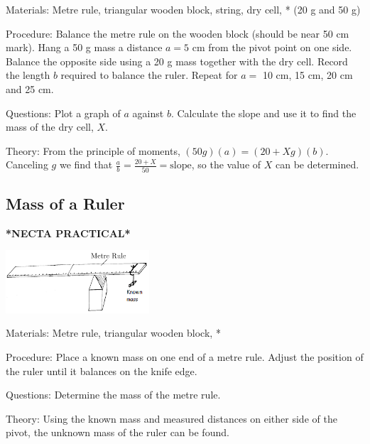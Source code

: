 \begin{multicols}{2}
\begin{description*}
\item[Materials:]{Metre rule, triangular wooden block, string, dry cell, * (20 g and 50 g)}
\item[Procedure:]{Balance the metre rule on the wooden block (should be near 50 cm mark). Hang a 50 g mass a distance $a=5$ cm from the pivot point on one side. Balance the opposite side using a 20 g mass together with the dry cell. Record the length $b$ required to balance the ruler. Repeat for $a =$ 10 cm, 15 cm, 20 cm and 25 cm.}
\item[Questions:]{Plot a graph of $a$ against $b$. Calculate the slope and use it to find the mass of the dry cell, $X$.}
\item[Theory:]{From the principle of moments, $(50 g)(a) = (20 + X g)(b)$. Canceling $g$ we find that $\frac{a}{b} = \frac{20 + X}{50} = \text{slope}$, so the value of $X$ can be determined.}
\end{description*}

\subsection{Mass of a Ruler}
\textbf{*NECTA PRACTICAL*}

\begin{center}
\includegraphics[width=0.4\textwidth]{./img/mass-of-ruler.png}
\end{center}

\begin{description*}
\item[Materials:]{Metre rule, triangular wooden block, *}
\item[Procedure:]{Place a known mass on one end of a metre rule. Adjust the position of the ruler until it balances on the knife edge.}
\item[Questions:]{Determine the mass of the metre rule.}
\item[Theory:]{Using the known mass and measured distances on either side of the pivot, the unknown mass of the ruler can be found.}
\end{description*}


\end{multicols}
